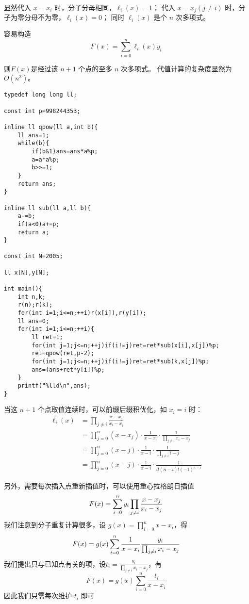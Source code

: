 \documentclass{ctexart}
\begin{document}
显然代入 $x = x_i$ 时，分子分母相同，$\ell_i(x) = 1$；
代入 $x = x_j (j\not = i)$ 时，分子为零分母不为零，$\ell_i(x) = 0$；
同时 $\ell_i(x)$ 是个 $n$ 次多项式。

容易构造 
$$
F(x) = \sum_{i = 0}^{n} \ell_i(x)y_i
$$

则$F(x)$是经过该 $n + 1$ 个点的至多 $n$ 次多项式。
代值计算的复杂度显然为 $O(n^2)$。

\begin{lstlisting}
typedef long long ll;

const int p=998244353;

inline ll qpow(ll a,int b){
    ll ans=1;
    while(b){
        if(b&1)ans=ans*a%p;
        a=a*a%p;
        b>>=1;
    }
    return ans;
}

inline ll sub(ll a,ll b){
    a-=b;
    if(a<0)a+=p;
    return a;
}

const int N=2005;

ll x[N],y[N];

int main(){
    int n,k;
    r(n);r(k);
    for(int i=1;i<=n;++i)r(x[i]),r(y[i]);
    ll ans=0;
    for(int i=1;i<=n;++i){
        ll ret=1;
        for(int j=1;j<=n;++j)if(i!=j)ret=ret*sub(x[i],x[j])%p;
        ret=qpow(ret,p-2);
        for(int j=1;j<=n;++j)if(i!=j)ret=ret*sub(k,x[j])%p;
        ans=(ans+ret*y[i])%p;
    }
    printf("%lld\n",ans);
}
\end{lstlisting}

当这 $n + 1$ 个点取值连续时，可以前缀后缀积优化，如 $x_i = i$ 时：
$$
\begin{aligned}
    \ell_i(x) &= \prod_{j\not = i} \frac{x - x_j}{x_i - x_j}\\
              &= \prod_{j = 0}^{n} (x - x_j) \cdot \frac{1}{x - x_i} \cdot \frac{1}{\prod_{j\not = i} x_i - x_j}\\
              &= \prod_{j = 0}^{n} (x - j) \cdot \frac{1}{x - i} \cdot \frac{1}{\prod_{j\not = i} i - j}\\
              &= \prod_{j = 0}^{n} (x - j) \cdot \frac{1}{x - i} \cdot \frac{1}{i!(n-i)!(-1)^{n-i}}
\end{aligned}
$$

另外，需要每次插入点重新插值时，可以使用重心拉格朗日插值
$$
F(x) = \sum_{i = 0}^{n} y_i\prod_{j\not = i} \frac{x - x_j}{x_i - x_j}\\
$$
我们注意到分子重复计算很多，设 $g(x) = \prod_{i = 0}^{n} x - x_i$，得
$$
F(x) = g(x)\sum_{i = 0}^{n} \frac{1}{x - x_i}\frac{y_i}{\prod_{j\not = i} x_i - x_j}\\
$$
我们提出只与已知点有关的项，设$t_i = \frac{y_i}{\prod_{j\not = i} x_i - x_j}$，有
$$
F(x) = g(x)\sum_{i = 0}^{n} \frac{t_i}{x - x_i}
$$
因此我们只需每次维护 $t_i$ 即可
\end{document}
